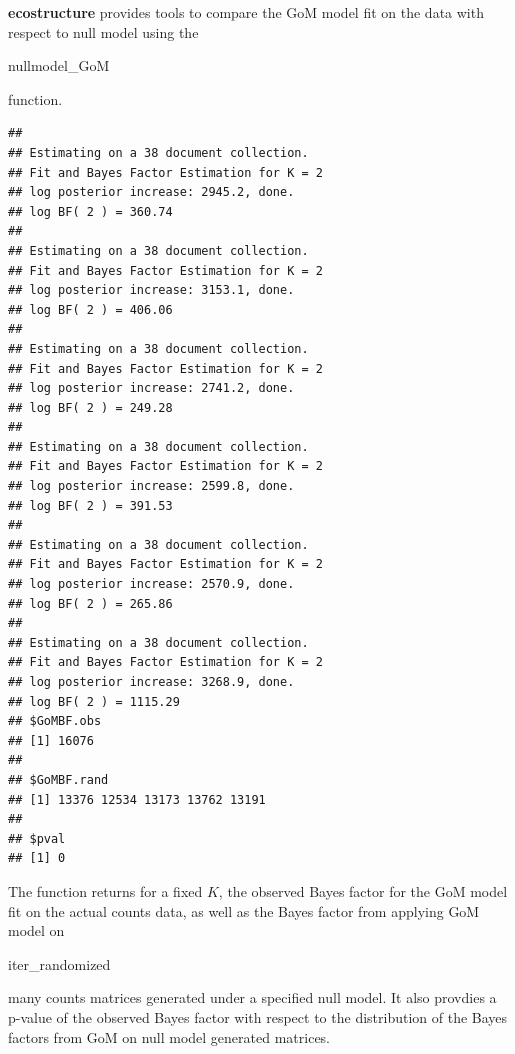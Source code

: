 \documentclass[12pt]{article}
\begin{document}
\newpage

\textbf{ecostructure} provides tools to compare the GoM model fit on the data with respect to null model using the \begin{verb} nullmodel_GoM \end{verb} function.

\begin{knitrout}
\color{fgcolor}\begin{kframe}
\begin{alltt}
 \hlstd{=}\hlstd{,}
               \hlstd{=}\hlstd{,} \hlstd{=}\hlstd{,}
               \hlstd{=}\hlstd{,} \hlstd{=}\hlstd{)}
\end{alltt}
\begin{verbatim}
## 
## Estimating on a 38 document collection.
## Fit and Bayes Factor Estimation for K = 2
## log posterior increase: 2945.2, done.
## log BF( 2 ) = 360.74
## 
## Estimating on a 38 document collection.
## Fit and Bayes Factor Estimation for K = 2
## log posterior increase: 3153.1, done.
## log BF( 2 ) = 406.06
## 
## Estimating on a 38 document collection.
## Fit and Bayes Factor Estimation for K = 2
## log posterior increase: 2741.2, done.
## log BF( 2 ) = 249.28
## 
## Estimating on a 38 document collection.
## Fit and Bayes Factor Estimation for K = 2
## log posterior increase: 2599.8, done.
## log BF( 2 ) = 391.53
## 
## Estimating on a 38 document collection.
## Fit and Bayes Factor Estimation for K = 2
## log posterior increase: 2570.9, done.
## log BF( 2 ) = 265.86
## 
## Estimating on a 38 document collection.
## Fit and Bayes Factor Estimation for K = 2
## log posterior increase: 3268.9, done.
## log BF( 2 ) = 1115.29
## $GoMBF.obs
## [1] 16076
## 
## $GoMBF.rand
## [1] 13376 12534 13173 13762 13191
## 
## $pval
## [1] 0
\end{verbatim}
\end{kframe}
\end{knitrout}

The function returns for a fixed $K$, the observed Bayes factor for the GoM model fit on the actual counts data, as well as the Bayes factor from applying GoM model on \begin{verb} iter_randomized \end{verb} many counts matrices generated under a specified null model. It also provdies a p-value of the observed Bayes factor with respect to the distribution of the Bayes factors from GoM on null model generated matrices.
\end{document}

